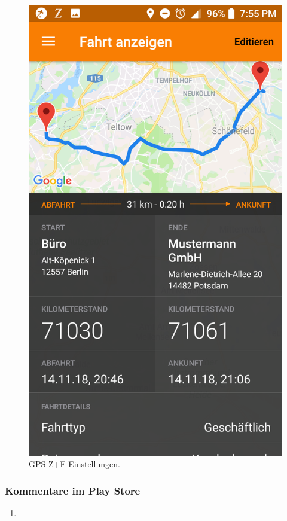 \documentclass[a4paper]{article}
\begin{document}
\begin{figure}[H]
        \includegraphics[scale=0.14]{img/pro5}
        \caption{\label{img:img/pro5}GPS Z+F Einstellungen.}
\end{figure}


\subsubsection{Kommentare im Play Store}
\begin{enumerate}
    \item
\end{enumerate}
\end{document}
